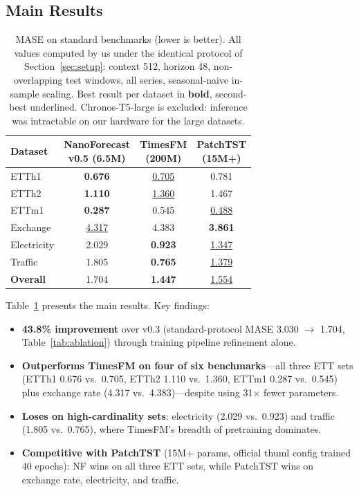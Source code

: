 \documentclass[11pt]{article}
\begin{document}
\subsection{Main Results}
\label{sec:results}

\begin{table}[t]
\centering
\caption{MASE on standard benchmarks (lower is better). All values computed by us under the identical protocol of Section~\ref{sec:setup}: context 512, horizon 48, non-overlapping test windows, all series, seasonal-naive in-sample scaling. Best result per dataset in \textbf{bold}, second-best underlined. Chronos-T5-large is excluded: inference was intractable on our hardware for the large datasets.}
\label{tab:main}
\small
\begin{tabular}{lccc}
\toprule
Dataset &
  \makecell{\textbf{NanoForecast}\\\textbf{v0.5 (6.5M)}} &
  \makecell{TimesFM\\(200M)} &
  \makecell{PatchTST\\(15M+)}\\
\midrule
ETTh1       & \textbf{0.676} & \underline{0.705} & 0.781 \\
ETTh2       & \textbf{1.110} & \underline{1.360} & 1.467 \\
ETTm1       & \textbf{0.287} & 0.545  & \underline{0.488} \\
Exchange    & \underline{4.317} & 4.383 & \textbf{3.861} \\
Electricity & 2.029 & \textbf{0.923} & \underline{1.347} \\
Traffic     & 1.805 & \textbf{0.765} & \underline{1.379} \\
\midrule
\textbf{Overall} & 1.704 & \textbf{1.447} & \underline{1.554} \\
\bottomrule
\end{tabular}
\end{table}

Table~\ref{tab:main} presents the main results. Key findings:

\begin{itemize}
\item \textbf{43.8\% improvement} over v0.3 (standard-protocol MASE 3.030 $\to$ 1.704, Table~\ref{tab:ablation}) through training pipeline refinement alone.
\item \textbf{Outperforms TimesFM on four of six benchmarks}---all three ETT sets (ETTh1 0.676 vs.\ 0.705, ETTh2 1.110 vs.\ 1.360, ETTm1 0.287 vs.\ 0.545) plus exchange rate (4.317 vs.\ 4.383)---despite using 31$\times$ fewer parameters.
\item \textbf{Loses on high-cardinality sets}: electricity (2.029 vs.\ 0.923) and traffic (1.805 vs.\ 0.765), where TimesFM's breadth of pretraining dominates.
\item \textbf{Competitive with PatchTST} (15M+ params, official thuml config trained 40 epochs): NF wins on all three ETT sets, while PatchTST wins on exchange rate, electricity, and traffic.
\end{itemize}
\end{document}
